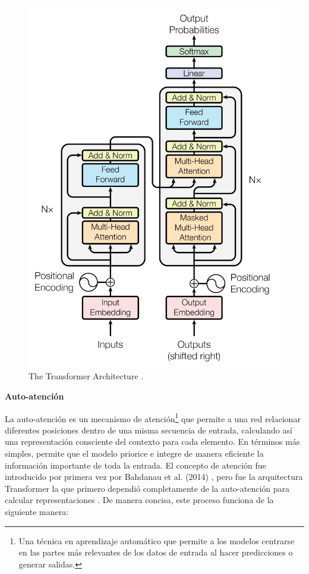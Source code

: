 \documentclass[a4paper,10pt]{book}
\begin{document}
\begin{figure}[h!]
    \centering
    \includegraphics[width=0.5\linewidth]{reports//assets/transformer.png}
    \caption[Transformer Architecture]{The Transformer Architecture \cite{vaswani_attention_2017}.}
    \label{fig:transformer}
\end{figure}

\textbf{Auto-atención}

La auto-atención es un mecanismo de atención\footnote{Una técnica en aprendizaje automático que permite a los modelos centrarse en las partes más relevantes de los datos de entrada al hacer predicciones o generar salidas.} que permite a una red relacionar diferentes posiciones dentro de una misma secuencia de entrada, calculando así una representación consciente del contexto para cada elemento. En términos más simples, permite que el modelo priorice e integre de manera eficiente la información importante de toda la entrada. El concepto de atención fue introducido por primera vez por Bahdanau et al. (2014) \cite{bahdanau_neural_2014}, pero fue la arquitectura Transformer la que primero dependió completamente de la auto-atención para calcular representaciones \cite{vaswani_attention_2017}. De manera concisa, este proceso funciona de la siguiente manera:
\end{document}
